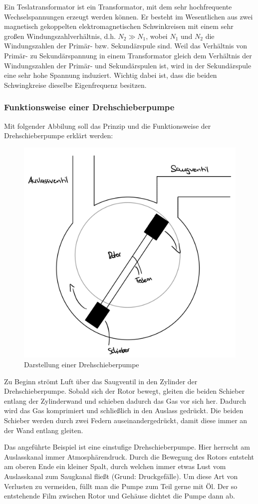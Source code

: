 \documentclass{article}
\begin{document}
Ein Teslatransformator ist ein Transformator, mit dem sehr hochfrequente
Wechselspannungen erzeugt werden können.
Er besteht im Wesentlichen aus zwei magnetisch gekoppelten elektromagnetischen
Schwinkreisen mit einem sehr großen Windungszahlverhältnis, d.h. $N_2 \gg N_1$,
wobei $N_1$ und $N_2$ die Windungszahlen der Primär- bzw. Sekundärspule sind.
Weil das Verhältnis von Primär- zu Sekundärspannung in einem Transformator
gleich dem Verhältnis der Windungszahlen der Primär- und Sekundärspulen ist,
wird in der Sekundärspule eine sehr hohe Spannung induziert.
Wichtig dabei ist, dass die beiden Schwingkreise dieselbe Eigenfrequenz besitzen.

\cite{leifi_tesla}


\subsubsection{Funktionsweise einer Drehschieberpumpe}

Mit folgender Abbilung soll das Prinzip und die Funktionsweise der Drehschieberpumpe erklärt werden:

\begin{figure}[H]
    \centering
    \includegraphics[width=0.5\linewidth]{Abbildungen/Drehschieberpumpe.jpeg}
    \caption{Darstellung einer Drehschieberpumpe}
\end{figure}

Zu Beginn strömt Luft über das Saugventil in den Zylinder der Drehschieberpumpe. Sobald sich der Rotor bewegt, gleiten die beiden Schieber entlang der Zylinderwand und schieben dadurch das Gas vor sich her. Dadurch wird das Gas komprimiert und schließlich in den Auslass gedrückt. Die beiden Schieber werden durch zwei Federn auseinandergedrückt, damit diese immer an der Wand entlang gleiten.

Das angeführte Beispiel ist eine einstufige Drehschieberpumpe. Hier herrscht am Auslasskanal immer Atmosphärendruck. Durch die Bewegung des Rotors entsteht am oberen Ende ein kleiner Spalt, durch welchen immer etwas Lust vom Auslasskanal zum Saugkanal fließt (Grund: Druckgefälle). Um diese Art von Verlusten zu vermeiden, füllt man die Pumpe zum Teil gerne mit Öl. Der so entstehende Film zwischen Rotor und Gehäuse dichtet die Pumpe dann ab. 
\end{document}
